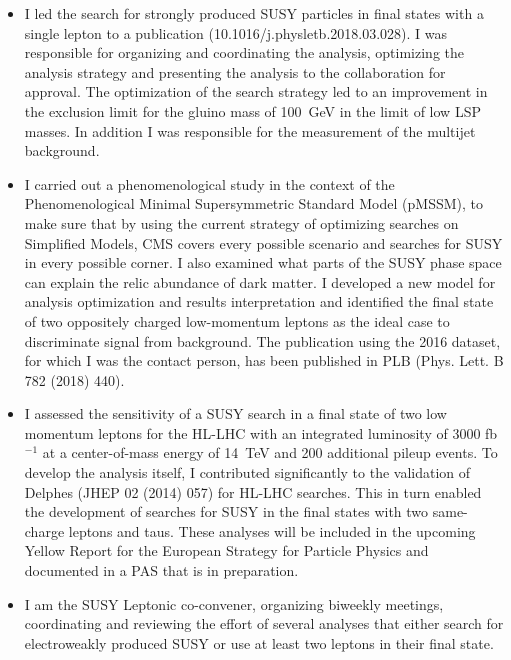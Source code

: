 \documentclass[]{cv} %
\begin{document}
\begin{resume}
\begin{itemize}
  \item I led the search for strongly produced SUSY particles in final states
        with a single lepton to a publication (10.1016/j.physletb.2018.03.028).
        I was responsible for organizing and coordinating the analysis,
        optimizing the analysis strategy and presenting the analysis to the
        collaboration for approval. The optimization of the search strategy led
        to an improvement in the exclusion limit for the gluino mass of 100~GeV
        in the limit of low LSP masses. In addition I was responsible for the
        measurement of the multijet background.
  \item I carried out a phenomenological study in the context of the
        Phenomenological Minimal Supersymmetric Standard Model (pMSSM), to make sure
        that by using the current strategy of optimizing searches on Simplified
        Models, CMS covers every possible scenario and searches for SUSY in every
        possible corner. I also examined what parts of the SUSY phase space can
        explain the relic abundance of dark matter. I developed a new model for
        analysis optimization and results interpretation and identified the
        final state of two oppositely charged low-momentum leptons as the ideal
        case to discriminate signal from background. The publication using the
        2016 dataset, for which I was the contact person, has been published in
        PLB (Phys. Lett. B 782 (2018) 440).
  \item I assessed the sensitivity of a SUSY search in a final state of two low
        momentum leptons for the HL-LHC with an integrated luminosity of 3000
        fb$^{-1}$ at a center-of-mass energy of 14~TeV and 200 additional pileup
        events. To develop the analysis itself, I contributed significantly to
        the validation of Delphes (JHEP 02 (2014) 057) for HL-LHC searches. This
        in turn enabled the development of searches for SUSY in the final states
        with two same-charge leptons and taus. These analyses will be included
        in the upcoming Yellow Report for the European Strategy for Particle
        Physics and documented in a PAS that is in preparation.
  \item I am the SUSY Leptonic co-convener, organizing biweekly meetings,
        coordinating and reviewing the effort of several analyses that either
        search for electroweakly produced SUSY or use at least two leptons in
        their final state.
\end{itemize}


\end{resume}
\end{document}
